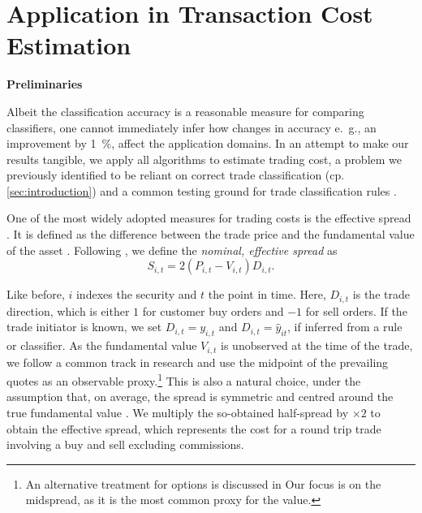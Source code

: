 \newpage
\section{Application in Transaction Cost Estimation}\label{sec:application}

\textbf{Preliminaries}


Albeit the classification accuracy is a reasonable measure for comparing classifiers, one cannot immediately infer how changes in accuracy e.~g., an improvement by \SI{1}{\percent}, affect the application domains. In an attempt to make our results tangible, we apply all algorithms to estimate trading cost, a problem we previously identified to be reliant on correct trade classification (cp. \cref{sec:introduction}) and a common testing ground for trade classification rules \autocites[cp.][541]{ellisAccuracyTradeClassification2000}[][569]{finucaneDirectTestMethods2000}[][271--278]{petersonEvaluationBiasesExecution2003}[][896--897]{savickasInferringDirectionOption2003}.

One of the most widely adopted measures for trading costs is the effective spread \autocite[][112]{Piwowar_2006}. It is defined as the difference between the trade price and the fundamental value of the asset \autocite[][238--239]{bessembinderIssuesAssessingTrade2003}. Following \textcite[][238--239]{bessembinderIssuesAssessingTrade2003}, we define the \emph{nominal, effective spread} as
\begin{equation}
    S_{i,t} = 2 (P_{i,t} - V_{i,t}) D_{i,t}.
    \label{eq:effective-spread}
\end{equation}

Like before, $i$ indexes the security and $t$ the point in time. Here, $D_{i,t}$ is the trade direction, which is either $1$ for customer buy orders and $-1$ for sell orders. If the trade initiator is known, we set $D_{i,t} = y_{i,t}$ and $D_{i,t}=\hat{y}_{it}$, if inferred from a rule or classifier. As the fundamental value $V_{i,t}$ is unobserved at the time of the trade, we follow a common track in research and use the midpoint of the prevailing quotes as an observable proxy.\footnote{An alternative treatment for options is discussed in \textcite[][4975--4976]{muravyevOptionsTradingCosts2020} Our focus is on the midspread, as it is the most common proxy for the value.} This is also a natural choice, under the assumption that, on average, the spread is symmetric and centred around the true fundamental value \autocite[][1018]{leeMarketIntegrationPrice1993}. We multiply the so-obtained half-spread by $\times 2$ to obtain the effective spread, which represents the cost for a round trip trade involving a buy and sell excluding commissions.

